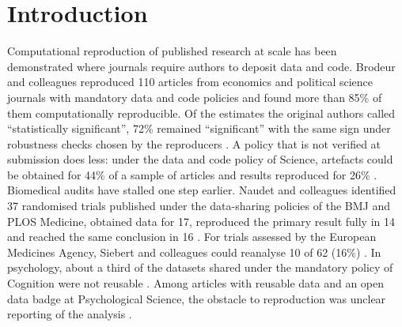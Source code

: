 \section{Introduction}\label{introduction}

Computational reproduction of published research at scale has been demonstrated where journals require authors to deposit data and code. Brodeur and colleagues reproduced 110 articles from economics and political science journals with mandatory data and code policies and found more than 85\% of them computationally reproducible. Of the estimates the original authors called ``statistically significant'', 72\% remained ``significant'' with the same sign under robustness checks chosen by the reproducers \cite{Brodeur_2026}. A policy that is not verified at submission does less: under the data and code policy of Science, artefacts could be obtained for 44\% of a sample of articles and results reproduced for 26\% \cite{Stodden_2018}. Biomedical audits have stalled one step earlier. Naudet and colleagues identified 37 randomised trials published under the data-sharing policies of the BMJ and PLOS Medicine, obtained data for 17, reproduced the primary result fully in 14 and reached the same conclusion in 16 \cite{Naudet_2018}. For trials assessed by the European Medicines Agency, Siebert and colleagues could reanalyse 10 of 62 (16\%) \cite{Siebert_2022}. In psychology, about a third of the datasets shared under the mandatory policy of Cognition were not reusable \cite{Hardwicke_2018}. Among articles with reusable data and an open data badge at Psychological Science, the obstacle to reproduction was unclear reporting of the analysis \cite{Hardwicke_2021}.

